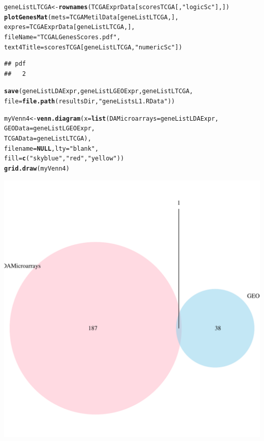 \documentclass[a4paper,10pt]{article}\usepackage[]{graphicx}\usepackage[]{color}
\makeatletter
\def\maxwidth{ %
  \ifdim\Gin@nat@width>\linewidth
    \linewidth
  \else
    \Gin@nat@width
  \fi
}
\newcommand{\hlstr}[1]{\textcolor[rgb]{0.192,0.494,0.8}{#1}}%
\newcommand{\hlstd}[1]{\textcolor[rgb]{0.345,0.345,0.345}{#1}}%
\newcommand{\hlkwa}[1]{\textcolor[rgb]{0.161,0.373,0.58}{\textbf{#1}}}%
\newcommand{\hlkwb}[1]{\textcolor[rgb]{0.69,0.353,0.396}{#1}}%
\newcommand{\hlkwc}[1]{\textcolor[rgb]{0.333,0.667,0.333}{#1}}%
\newcommand{\hlkwd}[1]{\textcolor[rgb]{0.737,0.353,0.396}{\textbf{#1}}}%
\newenvironment{kframe}{%
 \def\at@end@of@kframe{}%
 \ifinner\ifhmode%
  \def\at@end@of@kframe{\end{minipage}}%
  \begin{minipage}{\columnwidth}%
 \fi\fi%
 \def\FrameCommand##1{\hskip\@totalleftmargin \hskip-\fboxsep
 \colorbox{shadecolor}{##1}\hskip-\fboxsep
     \hskip-\linewidth \hskip-\@totalleftmargin \hskip\columnwidth}%
 \MakeFramed {\advance\hsize-\width
   \@totalleftmargin\z@ \linewidth\hsize
   \@setminipage}}%
 {\par\unskip\endMakeFramed%
 \at@end@of@kframe}
\newenvironment{knitrout}{}{} %
\makeatother
\begin{document}
\begin{knitrout}
\begin{kframe}
\begin{alltt}
\hlstd{geneListLTCGA} \hlkwb{<-} \hlkwd{rownames}\hlstd{(TCGAExprData[scoresTCGA[,}\hlstr{"logicSc"}\hlstd{],])}
\hlkwd{plotGenesMat} \hlstd{(}\hlkwc{mets}\hlstd{=TCGAMetilData[geneListLTCGA,],}
              \hlkwc{expres}\hlstd{=TCGAExprData[geneListLTCGA,],}
              \hlkwc{fileName} \hlstd{=}\hlstr{"TCGALGenesScores.pdf"}\hlstd{,}
              \hlkwc{text4Title} \hlstd{= scoresTCGA[geneListLTCGA,}\hlstr{"numericSc"}\hlstd{])}
\end{alltt}
\begin{verbatim}
## pdf 
##   2
\end{verbatim}
\begin{alltt}
\hlkwd{save}\hlstd{(geneListLDAExpr, geneListLGEOExpr,  geneListLTCGA,}
     \hlkwc{file}\hlstd{=}\hlkwd{file.path}\hlstd{(resultsDir,} \hlstr{"geneListsL1.RData"}\hlstd{))}

\hlstd{myVenn4}\hlkwb{<-} \hlkwd{venn.diagram}\hlstd{(}\hlkwc{x}\hlstd{=}\hlkwd{list}\hlstd{(}\hlkwc{DAMicroarrays}\hlstd{=geneListLDAExpr,}
                              \hlkwc{GEOData}\hlstd{=geneListLGEOExpr,}
                              \hlkwc{TCGAData}\hlstd{=geneListLTCGA),}
                              \hlkwc{filename}\hlstd{=}\hlkwa{NULL}\hlstd{,} \hlkwc{lty} \hlstd{=} \hlstr{"blank"}\hlstd{,}
                              \hlkwc{fill}\hlstd{=}\hlkwd{c}\hlstd{(}\hlstr{"skyblue"}\hlstd{,} \hlstr{"red"}\hlstd{,} \hlstr{"yellow"}\hlstd{))}
\hlkwd{grid.draw}\hlstd{(myVenn4)}
\end{alltt}
\end{kframe}
\includegraphics[width=\maxwidth]{figure/selectLGenes1-1} 

\end{knitrout}
\end{document}
